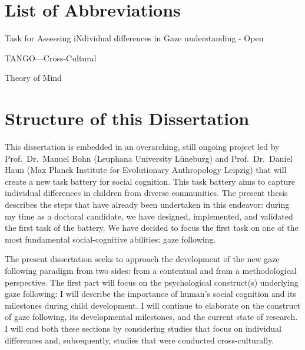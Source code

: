 \documentclass[
]{scrbook}
\providecommand{\tightlist}{%
  \setlength{\itemsep}{0pt}\setlength{\parskip}{0pt}}
\begin{document}
\renewcommand{\baselinestretch}{0.9999}\normalsize
\tableofcontents
\renewcommand{\baselinestretch}{1.0}\normalsize

\chapter{List of Abbreviations}\label{acronyms_HEADER_LOA}

\begin{description}
\tightlist
\item[\phantomsection\label{acronyms_TANGO}{TANGO}]
Task for Assessing iNdividual differences in Gaze understanding - Open
\item[\phantomsection\label{acronyms_TANGOux2014CC}{TANGO---CC}]
TANGO---Cross-Cultural
\item[\phantomsection\label{acronyms_ToM}{ToM}]
Theory of Mind
\end{description}

\chapter*{Structure of this Dissertation}\label{structure}

This dissertation is embedded in an overarching, still ongoing project led by Prof.~Dr.~Manuel Bohn (Leuphana University Lüneburg) and Prof.~Dr.~Daniel Haun (Max Planck Institute for Evolutionary Anthropology Leipzig) that will create a new task battery for social cognition. This task battery aims to capture individual differences in children from diverse communities. The present thesis describes the steps that have already been undertaken in this endeavor: during my time as a doctoral candidate, we have designed, implemented, and validated the first task of the battery. We have decided to focus the first task on one of the most fundamental social-cognitive abilities: gaze following.

The present dissertation seeks to approach the development of the new gaze following paradigm from two sides: from a contentual and from a methodological perspective. The first part will focus on the psychological construct(s) underlying gaze following: I will describe the importance of human's social cognition and its milestones during child development. I will continue to elaborate on the construct of gaze following, its developmental milestones, and the current state of research. I will end both these sections by considering studies that focus on individual differences and, subsequently, studies that were conducted cross-culturally.
\end{document}
